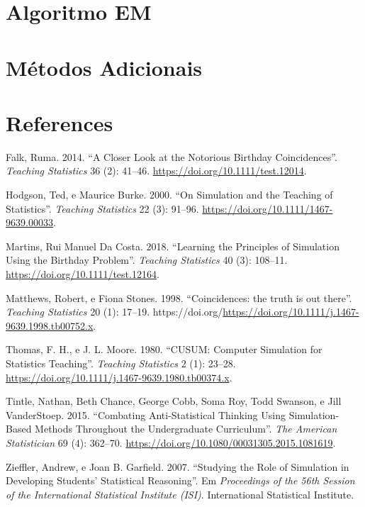 \documentclass[
  letterpaper,
  DIV=11,
  numbers=noendperiod]{scrreprt}
\newlength{\cslhangindent}
\newenvironment{CSLReferences}[2] %
 {\begin{list}{}{%
  \setlength{\itemindent}{0pt}
  \setlength{\leftmargin}{0pt}
  \setlength{\parsep}{0pt}
  \ifodd #1
   \setlength{\leftmargin}{\cslhangindent}
   \setlength{\itemindent}{-1\cslhangindent}
  \fi
  \setlength{\itemsep}{#2\baselineskip}}}
 {\end{list}}
\begin{document}

\chapter{Algoritmo EM}\label{algoritmo-em}


\chapter{Métodos Adicionais}\label{muxe9todos-adicionais}


\chapter*{References}\label{references}


\label{refs}
\begin{CSLReferences}{1}{0}
Falk, Ruma. 2014. {``A Closer Look at the Notorious Birthday
Coincidences''}. \emph{Teaching Statistics} 36 (2): 41--46.
\url{https://doi.org/10.1111/test.12014}.

Hodgson, Ted, e Maurice Burke. 2000. {``On Simulation and the Teaching
of Statistics''}. \emph{Teaching Statistics} 22 (3): 91--96.
\url{https://doi.org/10.1111/1467-9639.00033}.

Martins, Rui Manuel Da Costa. 2018. {``Learning the Principles of
Simulation Using the Birthday Problem''}. \emph{Teaching Statistics} 40
(3): 108--11. \url{https://doi.org/10.1111/test.12164}.

Matthews, Robert, e Fiona Stones. 1998. {``Coincidences: the truth is
out there''}. \emph{Teaching Statistics} 20 (1): 17--19.
https://doi.org/\url{https://doi.org/10.1111/j.1467-9639.1998.tb00752.x}.

Thomas, F. H., e J. L. Moore. 1980. {``{CUSUM}: Computer Simulation for
Statistics Teaching''}. \emph{Teaching Statistics} 2 (1): 23--28.
\url{https://doi.org/10.1111/j.1467-9639.1980.tb00374.x}.

Tintle, Nathan, Beth Chance, George Cobb, Soma Roy, Todd Swanson, e Jill
VanderStoep. 2015. {``Combating Anti-Statistical Thinking Using
Simulation-Based Methods Throughout the Undergraduate Curriculum''}.
\emph{The American Statistician} 69 (4): 362--70.
\url{https://doi.org/10.1080/00031305.2015.1081619}.

Zieffler, Andrew, e Joan B. Garfield. 2007. {``Studying the Role of
Simulation in Developing Students' Statistical Reasoning''}. Em
\emph{Proceedings of the 56th Session of the International Statistical
Institute (ISI)}. International Statistical Institute.

\end{CSLReferences}
\end{document}
